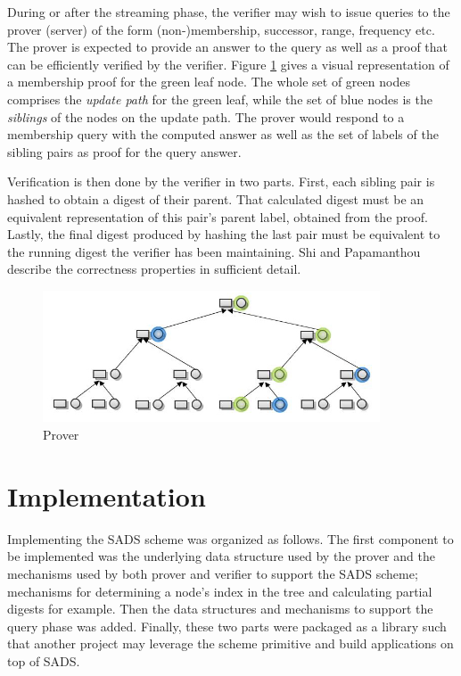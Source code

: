 \documentclass[11pt, letterpaper, oneside]{article}
\begin{document}
		During or after the streaming phase, the verifier may wish to issue queries to the prover (server) of the form (non-)membership, successor, range, frequency etc. 
		The prover is expected to provide an answer to the query as well as a proof that can be efficiently verified by the verifier.
		Figure \ref{fig:proof} gives a visual representation of a membership proof for the green leaf node.
		The whole set of green nodes comprises the \textit{update path} for the green leaf, while
		the set of blue nodes is the \textit{siblings} of the nodes on the update path.
		The prover would respond to a membership query with the computed answer as well as the set of labels of the sibling pairs as proof for the query answer. 

		Verification is then done by the verifier in two parts.
		First, each sibling pair is hashed to obtain a digest of their parent.
		That calculated digest must be an equivalent representation of this pair's parent label, obtained from the proof.
		Lastly, the final digest produced by hashing the last pair must be equivalent to the running digest the verifier has been maintaining.
		Shi and Papamanthou \cite{sads} describe the correctness properties in sufficient detail.

		\begin{figure}[h]
		\centering
		\includegraphics[width=100mm]{./images/8.jpg}
		\caption[]{Prover}
		\label{fig:proof}
		\end{figure}


\section{ Implementation }
\label{sec:impl}

	Implementing the SADS scheme was organized as follows.
	The first component to be implemented was the underlying data structure used by the prover and the mechanisms used by both prover and verifier to support the SADS scheme; mechanisms for determining a node's index in the tree and calculating partial digests for example.
	Then the data structures and mechanisms to support the query phase was added.
	Finally, these two parts were packaged as a library such that another project may leverage the scheme primitive and build applications on top of SADS.
\end{document}
